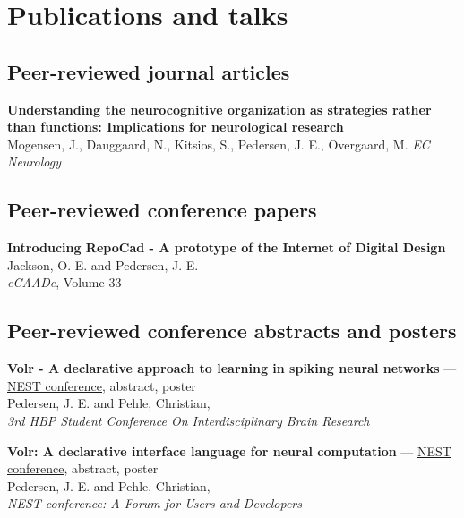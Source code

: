 \documentclass[11pt, a4paper]{article}
\newcommand{\years}[1]{\marginnote{\scriptsize #1}}
\begin{document}
\section*{Publications and talks}
\subsection*{Peer-reviewed journal articles}
\years{2018}\textbf{Understanding the neurocognitive organization as strategies rather
than functions: Implications for neurological research}\\
Mogensen, J., Dauggaard, N., Kitsios, S., Pedersen, J. E., Overgaard, M.
\emph{EC Neurology}

\pagebreak

\subsection*{Peer-reviewed conference papers}
\years{2015}\textbf{Introducing RepoCad - A prototype of the Internet of Digital
Design}\\
Jackson, O. E. and Pedersen, J. E.\\
\emph{eCAADe}, Volume 33

\begin{comment}
\subsection*{Unpublished articles}
\years{2019}\textbf{A Language Approach to Metaplasticity and Learning in Neural Networks} \\
Pedersen, J. E. and Pehle, Christian,\\
\emph{Unpublished, expected October 2019}, Computer Science, Mathematics
\end{comment}

\subsection*{Peer-reviewed conference abstracts and posters}
\years{2019}\textbf{Volr - A declarative approach to learning in spiking neural networks} 
--- \href{https://education.humanbrainproject.eu/web/3rd-hbp-student-conference}{NEST
conference}, abstract, poster\\
Pedersen, J. E. and Pehle, Christian,\\
\emph{3rd HBP Student Conference On Interdisciplinary Brain Research}

\years{2018}\textbf{Volr: A declarative interface language for neural computation}
--- \href{https://indico-jsc.fz-juelich.de/event/71/}{NEST
conference}, abstract, poster\\
Pedersen, J. E. and Pehle, Christian,\\
\emph{NEST conference: A Forum for Users and Developers}
\end{document}
